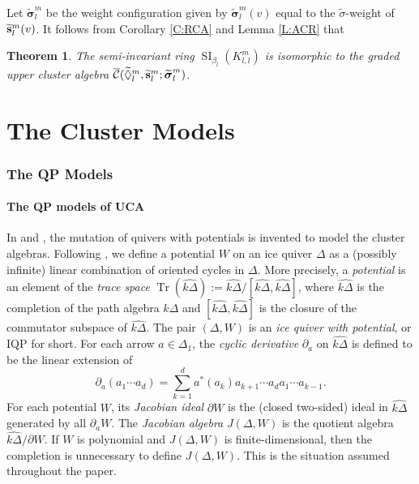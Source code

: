 \documentclass{amsart}
\newtheorem{theorem}{Theorem}[section]
\theoremstyle{definition}
\theoremstyle{remark}
\numberwithin{equation}{section}
\DeclareMathOperator{\SI}{SI}
\DeclareMathOperator{\Tr}{Tr}
\newcommand{\mc}[1]{\mathcal{#1}}
\renewcommand{\b}[1]{\bold{#1}}
\newcommand{\bs}[1]{\boldsymbol{#1}}
\newcommand{\br}[1]{\overline{#1}}
\newcommand{\wtd}[1]{\widetilde{#1}}
\newcommand{\ckQ}{\widehat{k\Delta}}
\newcommand{\uca}{\br{\mc{C}}}
\newcommand{\kllm}{{K_{l,l}^m}}
\newcommand{\bl}{{\beta_l}}
\begin{document}
Let $\wtd{\bs{\sigma}}_l^m$ be the weight configuration given by $\wtd{\bs{\sigma}}_l^m(v)$ equal to the $\wtd{\sigma}$-weight of $\wtd{\b{s}}_l^m(v)$. It follows from Corollary \ref{C:RCA} and Lemma \ref{L:ACR} that
\begin{theorem} \label{T:equal} The semi-invariant ring $\SI_\bl(\kllm)$ is isomorphic to the graded upper cluster algebra $\uca(\wtd{\Diamond}_l^m,\wtd{\b{s}}_l^m; \wtd{\bs{\sigma}}_l^m)$.
\end{theorem}


\part{The Cluster Models} \label{P:II}
\section{The QP Models} \label{S:QP}
\subsection{The QP models of UCA} \label{ss:QP}
In \cite{DWZ1} and \cite{DWZ2}, the mutation of quivers with potentials is invented to model the cluster algebras.
Following \cite{DWZ1}, we define a potential $W$ on an ice quiver $\Delta$ as a (possibly infinite) linear combination of oriented cycles in $\Delta$.
More precisely, a {\em potential} is an element of the {\em trace space} $\Tr(\ckQ):=\ckQ/[\ckQ,\ckQ]$,
where $\ckQ$ is the completion of the path algebra $k\Delta$ and $[\ckQ,\ckQ]$ is the closure of the commutator subspace of $\ckQ$.
The pair $(\Delta,W)$ is an {\em ice quiver with potential}, or IQP for short.
For each arrow $a\in \Delta_1$, the {\em cyclic derivative} $\partial_a$ on $\widehat{k\Delta}$ is defined to be the linear extension of
$$\partial_a(a_1\cdots a_d)=\sum_{k=1}^{d}a^*(a_k)a_{k+1}\cdots a_da_1\cdots a_{k-1}.$$
For each potential $W$, its {\em Jacobian ideal} $\partial W$ is the (closed two-sided) ideal in $\ckQ$ generated by all $\partial_a W$.
The {\em Jacobian algebra} $J(\Delta,W)$ is the quotient algebra $\widehat{k\Delta}/\partial W$.
If $W$ is polynomial and $J(\Delta,W)$ is finite-dimensional, then the completion is unnecessary to define $J(\Delta,W)$.
This is the situation assumed throughout the paper.
\end{document}
